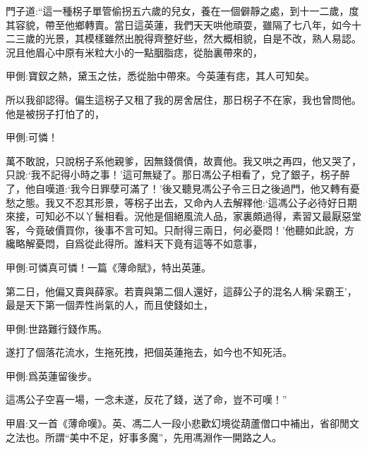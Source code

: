 \begin{parag}
    門子道:“這一種柺子單管偷拐五六歲的兒女，養在一個僻靜之處，到十一二歲，度其容貌，帶至他鄉轉賣。當日這英蓮，我們天天哄他頑耍，雖隔了七八年，如今十二三歲的光景，其模樣雖然出脫得齊整好些，然大概相貌，自是不改，熟人易認。況且他眉心中原有米粒大小的一點胭脂痣，從胎裏帶來的，\begin{note}甲側:寶釵之熱，黛玉之怯，悉從胎中帶來。今英蓮有痣，其人可知矣。\end{note}所以我卻認得。偏生這柺子又租了我的房舍居住，那日柺子不在家，我也曾問他。他是被拐子打怕了的，\begin{note}甲側:可憐！\end{note}萬不敢說，只說柺子系他親爹，因無錢償債，故賣他。我又哄之再四，他又哭了，只說:‘我不記得小時之事！’這可無疑了。那日馮公子相看了，兌了銀子，柺子醉了，他自嘆道:‘我今日罪孽可滿了！’後又聽見馮公子令三日之後過門，他又轉有憂愁之態。我又不忍其形景，等柺子出去，又命內人去解釋他:‘這馮公子必待好日期來接，可知必不以丫鬟相看。況他是個絕風流人品，家裏頗過得，素習又最厭惡堂客，今竟破價買你，後事不言可知。只耐得三兩日，何必憂悶！’他聽如此說，方纔略解憂悶，自爲從此得所。誰料天下竟有這等不如意事，\begin{note}甲側:可憐真可憐！一篇《薄命賦》，特出英蓮。\end{note}第二日，他偏又賣與薛家。若賣與第二個人還好，這薛公子的混名人稱‘呆霸王’，最是天下第一個弄性尚氣的人，而且使錢如土，\begin{note}甲側:世路難行錢作馬。\end{note}遂打了個落花流水，生拖死拽，把個英蓮拖去，如今也不知死活。\begin{note}甲側:爲英蓮留後步。\end{note}這馮公子空喜一場，一念未遂，反花了錢，送了命，豈不可嘆！”\begin{note}甲眉:又一首《薄命嘆》。英、馮二人一段小悲歡幻境從葫蘆僧口中補出，省卻閒文之法也。所謂“美中不足，好事多魔”，先用馮淵作一開路之人。\end{note}
\end{parag}


